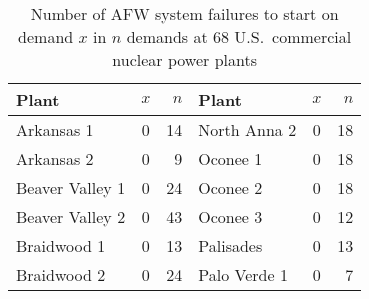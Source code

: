 \documentclass {book}
\begin{document}
\begin{enumerate}[\ref{ch10}.1]
\begin{table}
\caption{Number of AFW system failures to start on demand $x$
in $n$ demands at 68 U.S.\ commercial nuclear power
plants \citep{PGGGK98}}\label{ch10:tab8}
 \centering
\begin{tabular}{lcr |lcr}
\hline Plant     & $x$                   & $n${\hspace{0.1in}} & {\hspace{0.1in}}Plant            & $x$                   & $n$\\
\hline%
Arkansas       1 & {\hspace{0.1in}}0\mbox{\hspace{0.1in}} & 14\phantom{*}   &{\hspace{0.1in}}North Anna 2     & {\hspace{0.1in}}0\mbox{\hspace{0.1in}} & 18\\
Arkansas       2 & {\hspace{0.1in}}0\mbox{\hspace{0.1in}} & 9\phantom{*}    &{\hspace{0.1in}}Oconee 1         & {\hspace{0.1in}}0\mbox{\hspace{0.1in}} & 18\\
Beaver Valley 1  & {\hspace{0.1in}}0\mbox{\hspace{0.1in}} & 24\phantom{*}   &{\hspace{0.1in}}Oconee 2         & {\hspace{0.1in}}0\mbox{\hspace{0.1in}} & 18\\
Beaver Valley 2  & {\hspace{0.1in}}0\mbox{\hspace{0.1in}} & 43\phantom{*}   &{\hspace{0.1in}}Oconee 3         & {\hspace{0.1in}}0\mbox{\hspace{0.1in}} & 12\\
Braidwood 1      & {\hspace{0.1in}}0\mbox{\hspace{0.1in}} & 13\phantom{*}   &{\hspace{0.1in}}Palisades        & {\hspace{0.1in}}0\mbox{\hspace{0.1in}} & 13 \\
Braidwood 2      & {\hspace{0.1in}}0\mbox{\hspace{0.1in}} & 24\phantom{*}   &{\hspace{0.1in}}Palo Verde 1     & {\hspace{0.1in}}0\mbox{\hspace{0.1in}} & 7\\

\end{tabular}
\end{table}
\end{enumerate}
\end{document}

